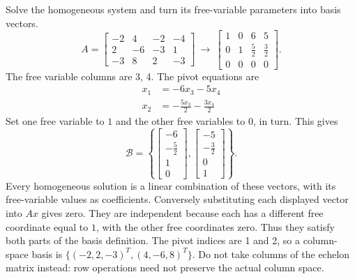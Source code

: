 \goal Solve the homogeneous system and turn its free-variable parameters into basis vectors.
\[A=\left[\begin{array}{rrrr}-2&4&-2&-4\\2&-6&-3&1\\-3&8&2&-3\end{array}\right]\ \longrightarrow\ \left[\begin{array}{rrrr}1&0&6&5\\0&1&\frac{5}{2}&\frac{3}{2}\\0&0&0&0\end{array}\right].\]
The free variable columns are 3, 4. The pivot equations are
\[\begin{aligned}x_{1}&=- 6 x_{3} - 5 x_{4}\\x_{2}&=- \frac{5 x_{3}}{2} - \frac{3 x_{4}}{2}\end{aligned}\]
Set one free variable to $1$ and the other free variables to $0$, in turn. This gives
\[\mathcal B=\left\{\left[\begin{array}{r}-6\\- \frac{5}{2}\\1\\0\end{array}\right],\left[\begin{array}{r}-5\\- \frac{3}{2}\\0\\1\end{array}\right]\right\}.\]
Every homogeneous solution is a linear combination of these vectors, with its free-variable values as coefficients. Conversely substituting each displayed vector into $Ax$ gives zero. They are independent because each has a different free coordinate equal to $1$, with the other free coordinates zero. Thus they satisfy both parts of the basis definition.
The pivot indices are 1 and 2, so a column-space basis is $\{(-2,2,-3)^T,(4,-6,8)^T\}$. Do not take columns of the echelon matrix instead: row operations need not preserve the actual column space.

